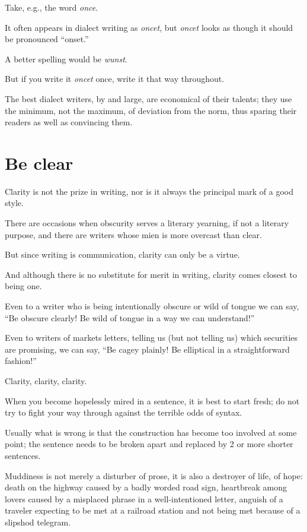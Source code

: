 \documentclass{book}
\numberwithin{equation}{section}
\begin{document}
Take, e.g., the word \textit{once}.

It often appears in dialect writing as \textit{oncet}, but \textit{oncet} looks as though it should be pronounced ``onset.''

A better spelling would be \textit{wunst}.

But if you write it \textit{oncet} once, write it that way throughout.

The best dialect writers, by and large, are economical of their talents; they use the minimum, not the maximum, of deviation from the norm, thus sparing their readers as well as convincing them.

\section{Be clear}
Clarity is not the prize in writing, nor is it always the principal mark of a good style.

There are occasions when obscurity serves a literary yearning, if not a literary purpose, and there are writers whose mien is more overcast than clear.

But since writing is communication, clarity can only be a virtue.

And although there is no substitute for merit in writing, clarity comes closest to being one.

Even to a writer who is being intentionally obscure or wild of tongue we can say, ``Be obscure clearly! Be wild of tongue in a way we can understand!''

Even to writers of markets letters, telling us (but not telling us) which securities are promising, we can say, ``Be cagey plainly! Be elliptical in a straightforward fashion!''

%
Clarity, clarity, clarity.

When you become hopelessly mired in a sentence, it is best to start fresh; do not try to fight your way through against the terrible odds of syntax.

Usually what is wrong is that the construction has become too involved at some point; the sentence needs to be broken apart and replaced by 2 or more shorter sentences.

%
Muddiness is not merely a disturber of prose, it is also a destroyer of life, of hope: death on the highway caused by a badly worded road sign, heartbreak among lovers caused by a misplaced phrase in a well-intentioned letter, anguish of a traveler expecting to be met at a railroad station and not being met because of a slipshod telegram.
\end{document}
